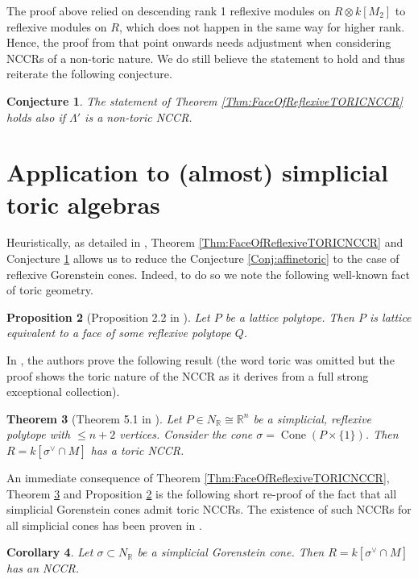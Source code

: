 \documentclass[reqno, 12pt]{amsart}
\newtheorem{theorem}{Theorem}[section]
\newtheorem{proposition}[theorem]{Proposition}
\newtheorem{corollary}[theorem]{Corollary}
\newtheorem{conjecture}[theorem]{Conjecture}
\theoremstyle{definition}
\numberwithin{equation}{section}
\newcommand{\R}{\mathbb{R}}
\newcommand{\cone}{\operatorname{Cone}}
\begin{document}
The proof above relied on descending rank 1 reflexive modules on $R\otimes k[M_2]$ to reflexive modules on $R$, which does not happen in the same way for higher rank. Hence, the proof from that point onwards needs adjustment when considering NCCRs of a non-toric nature. We do still believe the statement to hold and thus reiterate the following conjecture.
\begin{conjecture}
    \label{Conj:FaceRkBigger1}
The statement of Theorem \ref{Thm:FaceOfReflexiveTORICNCCR} holds also if $\Lambda'$ is a non-toric NCCR. 
\end{conjecture}


\section{Application to (almost) simplicial toric algebras}\label{sec:Applications}


Heuristically, as detailed in \cite{MS25}, Theorem \ref{Thm:FaceOfReflexiveTORICNCCR} and Conjecture \ref{Conj:FaceRkBigger1} allows us to reduce the Conjecture \ref{Conj:affinetoric} to the case of reflexive Gorenstein cones. Indeed, to do so we note the following well-known fact of toric geometry.
\begin{proposition}[Proposition 2.2 in \cite{HM06}]
    \label{Prop:FaceOfReflexive}
    Let $P$ be a lattice polytope. Then $P$ is lattice equivalent to a face of some reflexive polytope $Q$.
\end{proposition}

In \cite{MS25}, the authors prove the following result (the word toric was omitted but the proof shows the toric nature of the NCCR as it derives from a full strong exceptional collection).
\begin{theorem}[Theorem 5.1 in \cite{MS25}]
    \label{Thm:FanoAlmostSimplicial}
    Let $P\in N_{\R}\cong \R^n$ be a simplicial, reflexive polytope with $\le n+2$ vertices. Consider the cone $\sigma=\cone(P\times\{1\})$. Then $R=k[\sigma^\vee\cap M]$ has a toric NCCR.
\end{theorem}

An immediate consequence of Theorem \ref{Thm:FaceOfReflexiveTORICNCCR}, Theorem \ref{Thm:FanoAlmostSimplicial} and Proposition \ref{Prop:FaceOfReflexive} is the following short re-proof of the fact that all simplicial Gorenstein cones admit toric NCCRs. The existence of such NCCRs for all simplicial cones has been proven in \cite{FMS19}.

\begin{corollary}
    \label{Cor:SimplicialHasNCCR}
    Let $\sigma\subset N_{\R}$ be a simplicial Gorenstein cone. Then $R=k[\sigma^\vee\cap M]$ has an NCCR.
\end{corollary}
\end{document}
